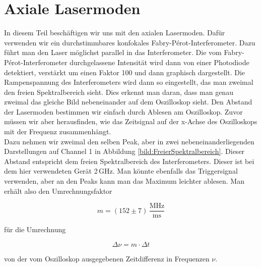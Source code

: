 \section{Axiale Lasermoden}

In diesem Teil beschäftigen wir uns mit den axialen Lasermoden. Dafür verwenden wir ein durchstimmbares konfokales Fabry-Pérot-Interferometer. 
Dazu führt man den Laser möglichst parallel in das Interferometer. Die vom Fabry-Pérot-Interferometer durchgelassene Intensität wird dann von einer 
Photodiode detektiert, verstärkt um einen Faktor 100 und dann graphisch dargestellt. Die Rampenspannung des Interferometers wird dann so eingestellt, 
das man zweimal den freien Spektralbereich sieht. Dies erkennt man daran, dass man genau zweimal das gleiche Bild nebeneinander auf dem Oszilloskop sieht. 
Den Abstand der Lasermoden bestimmen wir einfach durch Ablesen am Oszilloskop. Zuvor müssen wir aber herausfinden, wie das Zeitsignal auf der 
x-Achse des Oszilloskops mit der Frequenz zusammenhängt.\\

Dazu nehmen wir zweimal den selben Peak, aber in zwei nebeneinanderliegenden Darstellungen auf Channel 1 in Abbildung \ref{bild:FreierSpektralbereich}.
Dieser Abstand entspricht dem freien Spektralbereich des Interferometers. Dieser ist bei dem hier verwendeten Gerät 2\,GHz. Man könnte ebenfalls das Triggersignal verwenden, 
aber an den Peaks kann man das Maximum leichter ablesen. Man erhält also den Umrechnungsfaktor 

\begin{equation*}
    m = (152 \pm 7)\,\frac{\mathrm{MHz}}{\mathrm{ms}}
\end{equation*}

für die Umrechnung 

\begin{equation}
    \Delta \nu = m\cdot \Delta t
    \label{eq:Umrechnung}
\end{equation}

von der vom Oszilloskop ausgegebenen Zeitdifferenz in Frequenzen $\nu$.


